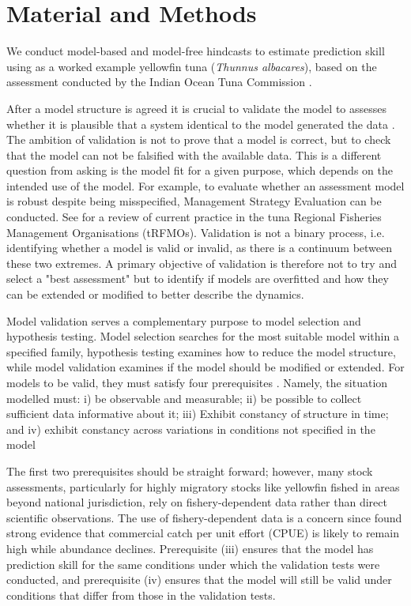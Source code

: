 \documentclass[12pt,halfline,a4paper,nonumbib]{ouparticle}
\begin{document}
\section{Material and Methods}

We conduct model-based and model-free hindcasts to estimate prediction skill using as a worked example yellowfin tuna (\textit{Thunnus albacares}), based on the assessment conducted by the Indian Ocean Tuna Commission \parencite{IOTWPTT21}. 

After a model structure is agreed it is crucial to validate the model to assesses whether it is plausible that a system identical to the model generated the data \parencite{thygesen2017validation}. The ambition of validation is not to prove that a model is correct, but to check that the model can not be falsified with the available data. This is a different question from asking is the model fit for a given purpose, which depends on the intended use of the model. For example, to evaluate whether an assessment model is robust  despite being misspecified, Management Strategy Evaluation \parencite[MSE,][]{punt2007developing} can be conducted. See \parencite{sharma2020trfmo} for a review of current practice in the tuna Regional Fisheries Management Organisations (tRFMOs). Validation is not a binary process, i.e. identifying whether a model is valid or invalid, as there is a continuum between these two extremes. A primary objective of validation is therefore not to try and select a "best assessment" but to identify if models are overfitted and how they can be extended or modified to better describe the dynamics.

Model validation serves a complementary purpose to model selection and hypothesis testing. Model selection searches for the most suitable model within a specified family, hypothesis testing examines how to reduce the model structure, while model validation examines if the model should be modified or extended. For models to be valid, they must satisfy four prerequisites \parencite{hodges1992you}. Namely, the situation modelled must: i) be observable and measurable; ii) be possible to collect sufficient data informative about it; iii) Exhibit constancy of structure in time; and iv) exhibit constancy across variations in conditions not specified in the model

The first two prerequisites should be straight forward; however, many stock assessments, particularly for highly migratory stocks like yellowfin fished in areas beyond national jurisdiction, rely on fishery-dependent data rather than direct scientific observations. The use of fishery-dependent data is a concern since \parencite{harley2001catch} found strong evidence that commercial catch per unit effort (CPUE) is likely to remain high while abundance declines.  Prerequisite (iii) ensures that the model has prediction skill for the same conditions under which the validation tests were conducted, and prerequisite (iv) ensures that the model will still be valid under conditions that differ from those in the validation tests.
\end{document}

